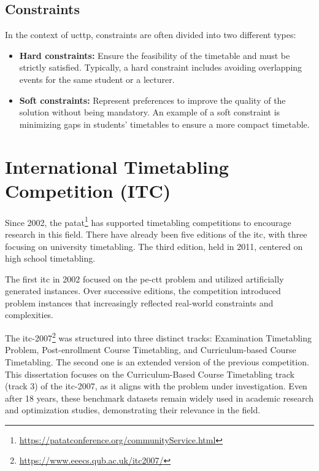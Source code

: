 \subsection{Constraints}
In the context of \ac{ucttp}, constraints are often divided into two different types:
\begin{itemize}
\item \textbf{Hard constraints:} Ensure the feasibility of the timetable and must be strictly satisfied. Typically, a hard constraint includes avoiding overlapping events for the same student or a lecturer. 
\item \textbf{Soft constraints:} Represent preferences to improve the quality of the solution without being mandatory. An example of a soft constraint is minimizing gaps in students' timetables to ensure a more compact timetable.
\end{itemize}

\section{International Timetabling Competition (ITC)}

Since 2002, the \ac{patat}\footnote{\url{https://patatconference.org/communityService.html}} has supported timetabling competitions to encourage research in this field. There have already been five editions of the \ac{itc}, with three focusing on university timetabling. The third edition, held in 2011, centered on high school timetabling.

The first \ac{itc} in 2002 focused on the \ac{pe-ctt} problem and utilized artificially generated instances. Over successive editions, the competition introduced problem instances that increasingly reflected real-world constraints and complexities.

The \ac{itc-2007}\footnote{\url{https://www.eeecs.qub.ac.uk/itc2007/}} was structured into three distinct tracks: Examination Timetabling Problem, Post-enrollment Course Timetabling, and Curriculum-based Course Timetabling. The second one is an extended version of the previous competition. This dissertation focuses on the Curriculum-Based Course Timetabling track (track 3) of the \ac{itc-2007}, as it aligns with the problem under investigation. Even after 18 years, these benchmark datasets remain widely used in academic research and optimization studies, demonstrating their relevance in the field.


